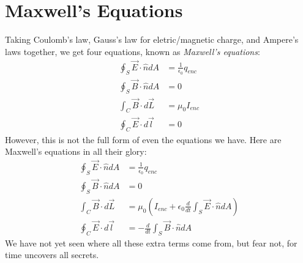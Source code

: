 \documentclass[nobib]{tufte-handout}
\begin{document}
\section{Maxwell's Equations}
Taking Coulomb's law, Gauss's law for eletric/magnetic charge, and Ampere's laws 
together, we get four equations, known 
as \emph{Maxwell's equations}: 
\begin{align*}
    \oint_S \vec{E} \cdot \hat{n} dA &= \frac{1}{\epsilon_0} q_{enc} \\
    \oint_S \vec{B} \cdot \hat{n} dA &= 0 \\
    \int_C \vec{B} \cdot d\vec{L} &= \mu_0 I_{enc} \\
    \oint_C \vec{E} \cdot d\vec{l} &= 0
\end{align*}
However, this is not the full form 
of even the equations we have. Here 
are Maxwell's equations in all their glory: 
\begin{align*}
    \oint_S \vec{E} \cdot \hat{n} dA &= \frac{1}{\epsilon_0} q_{enc} \\
    \oint_S \vec{B} \cdot \hat{n} dA &= 0 \\
    \int_C \vec{B} \cdot d\vec{L} &= \mu_0 \left(I_{enc} + \epsilon_0 \frac{d}{dt} \int_S \vec{E} \cdot \hat{n} dA \right) \\
    \oint_C \vec{E} \cdot d\vec{l} &= -\frac{d}{dt} \int_S \vec{B} \cdot \hat{n} dA 
\end{align*}
We have not yet seen where all these extra 
terms come from, but fear not, for 
time uncovers all secrets. 
\end{document}
